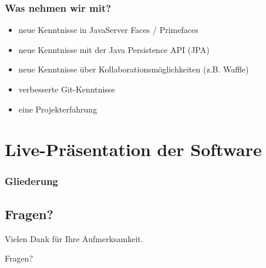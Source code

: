 \documentclass{beamer}
\begin{document}
\begin{frame}
\frametitle{Was nehmen wir mit?}
\begin{itemize}
\item neue Kenntnisse in JavaServer Faces / Primefaces
\item neue Kenntnisse mit der Java Persistence API (JPA)
\item neue Kenntnisse über Kollaborationsmöglichkeiten (z.B. Waffle)
\item verbesserte Git-Kenntnisse
\item eine Projekterfahrung
\end{itemize}
\end{frame}

\section{Live-Präsentation der Software}
\begin{frame}
\frametitle{Gliederung}
\tableofcontents[currentsection]
\end{frame}

\begin{frame}
\section{Fragen?}
\begin{center}

\Large
Vielen Dank für Ihre Aufmerksamkeit. \\\hspace{20pt}

\huge
{ Fragen?}
\end{center}
\end{frame}
\end{document}
